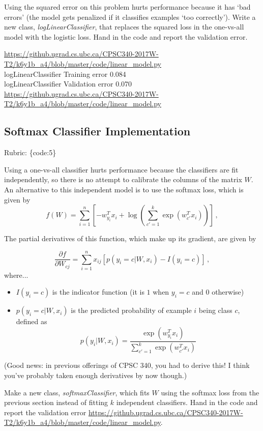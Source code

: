 \documentclass{article}
\def\rubric#1{\gre{Rubric: \{#1\}}}{}
\def\blu#1{{\color{blu}#1}}
\def\gre#1{{\color{gre}#1}}
\begin{document}
Using the squared error on this problem hurts performance because it has `bad errors' (the model gets penalized if it classifies examples `too correctly').
Write a new class, \emph{logLinearClassifier}, that replaces the squared loss in the one-vs-all model with the logistic loss. \blu{Hand in the code and report the validation error}.

\blu{\url{https://github.ugrad.cs.ubc.ca/CPSC340-2017W-T2/k6y1b_a4/blob/master/code/linear_model.py}\\
logLinearClassifier Training error 0.084\\
logLinearClassifier Validation error 0.070\\
\url{https://github.ugrad.cs.ubc.ca/CPSC340-2017W-T2/k6y1b_a4/blob/master/code/linear_model.py}}

\subsection{Softmax Classifier Implementation}
\rubric{code:5}

Using a one-vs-all classifier hurts performance because the classifiers are fit independently, so there is no attempt to calibrate the columns of the matrix $W$. An alternative to this independent model is to use the softmax loss, which is given by
\[
f(W) = \sum_{i=1}^n \left[-w_{y_i}^Tx_i + \log\left(\sum_{c' = 1}^k \exp(w_{c'}^Tx_i)\right)\right] \, ,
\]

The partial derivatives of this function, which make up its gradient, are given by

\[
\frac{\partial f}{\partial W_{cj}} = \sum_{i=1}^n x_{ij}[p(y_i=c | W,x_i) - I(y_i = c)] \, ,
\]
where... 
\begin{itemize}
\item $I(y_i = c)$ is the indicator function (it is $1$ when $y_i=c$ and $0$ otherwise)
\item $p(y_i=c | W, x_i)$ is the predicted probability of example $i$ being class $c$, defined as
\[
p(y_i | W, x_i) = \frac{\exp(w_{y_i}^Tx_i)}{\sum_{c'=1}^k\exp(w_{c'}^Tx_i)}
\]

\end{itemize}


(Good news: in previous offerings of CPSC 340, you had to derive this! I think you've probably taken enough derivatives by now though.)

Make a new class, \emph{softmaxClassifier}, which fits $W$ using the softmax loss from the previous section instead of fitting $k$ independent classifiers. \blu{Hand in the code and report the validation error
\url{https://github.ugrad.cs.ubc.ca/CPSC340-2017W-T2/k6y1b_a4/blob/master/code/linear_model.py}}.
\end{document}
